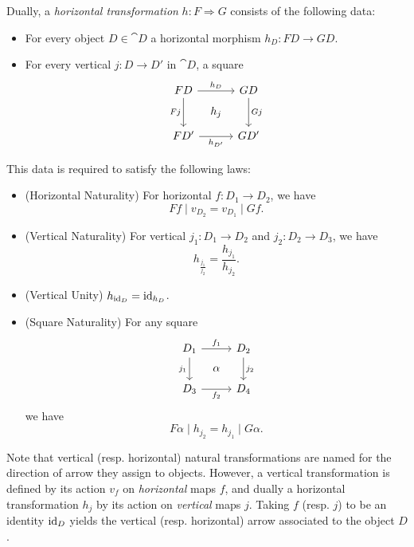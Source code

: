 \documentclass[DynamicalBook]{subfiles}
\begin{document}
\begin{definition}
Dually, a \emph{horizontal transformation} $h : F \Rightarrow G$ consists of the
following data:
\begin{itemize}
\item For every object $D \in \cat{D}$ a horizontal morphism $h_D : FD \to GD$.
\item For every vertical $j : D \to D'$ in $\cat{D}$, a square 
\[
        \begin{tikzcd}[sep=tiny]
          FD \ar[dd, "Fj"'] \ar[rr, "h_D"] & & GD
 \ar[dd, "Gj"] \\
           & h_j & \\
          FD' \ar[rr, "h_{D'}"'] & & GD'
        \end{tikzcd}
\]
\end{itemize}
This data is required to satisfy the following laws:
\begin{itemize}
\item (Horizontal Naturality) For horizontal $f : D_1 \to D_2$, we have
$$Ff \mid v_{D_2} = v_{D_1} \mid Gf.$$
\item (Vertical Naturality) For vertical $j_1 : D_1 \to D_2$ and $j_2 : D_2 \to
  D_3$, we have
$$h_{\frac{j_1}{j_2}} = \frac{h_{j_1}}{h_{j_2}}.$$
\item (Vertical Unity) $h_{\mathrm{id}_D} = \mathrm{id}_{h_D}$.
\item (Square Naturality) For any square
\[
        \begin{tikzcd}[sep=tiny]
          D_1 \ar[dd, "j_1"'] \ar[rr, "f_1"] & & D_2
 \ar[dd, "j_2"] \\
           & \alpha & \\
          D_3 \ar[rr, "f_2"'] & & D_4
        \end{tikzcd}
\]
we have 
$$F\alpha \mid h_{j_2} = h_{j_1} \mid G\alpha.$$
\end{itemize}
\end{definition}

\begin{remark}
Note that vertical (resp. horizontal) natural transformations are named for
the direction of arrow they assign to objects. However, a vertical
transformation is defined by its action $v_f$ on \emph{horizontal} maps $f$, and dually a
horizontal transformation $h_j$ by its action on \emph{vertical} maps $j$.
Taking $f$ (resp. $j$) to be an identity $\mathrm{id}_D$ yields the vertical (resp.
horizontal) arrow associated to the object $D$.
\end{remark}
\end{document}
